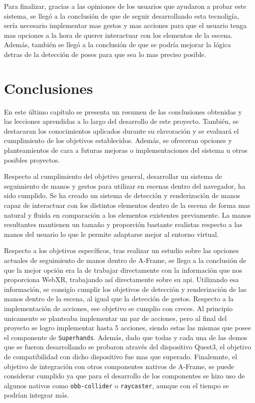 \documentclass[a4paper, 12pt]{book}
\begin{document}
Para finalizar, gracias a las opiniones de los usuarios que ayudaron a probar este sistema, se llegó a la conclusión de que de seguir desarrollando esta tecnoligía, sería necesario implementar mas gestos y mas acciones para que el usuario tenga mas opciones a la hora de querer interactuar con los elementos de la escena. Además, también se llegó a la conclusión de que se podría mejorar la lógica detras de la detección de poses para que sea lo mas preciso posible.


\cleardoublepage
\chapter{Conclusiones}
\label{chap:conclusiones}
En este último capítulo se presenta un resumen de las conclusiones obtenidas y las lecciones aprendidas a lo largo del desarrollo de este proyecto. También, se destacaran los conocimientos aplicados durante su elavoración y se evaluará el cumplimiento de los objetivos establecidos. Además, se ofreceran opciones y planteamientos de cara a futuras mejoras o implementaciones del sistema u otros posibles proyectos.

Respecto al cumplimiento del objetivo general, desarrollar un sistema de seguimiento de manos y gestos para utilizar en escenas dentro del navegador, ha sido cumplido. Se ha creado un sistema de detección y renderización de manos capaz de interactuar con los distintos elementos dentro de la escena de forma mas natural y fluida en comparación a los elementos existentes previamente. La manos resultantes mantienen un tamaño y proporción bastante realistas respecto a las manos del usuario lo que le permite adaptarse mejor al entorno virtual.

Respecto a los objetivos específicos, tras realizar un estudio sobre las opciones actuales de seguimiento de manos dentro de A-Frame, se llego a la conclusión de que la mejor opción era la de trabajar directamente con la información que nos proporciona WebXR, trabajando así directamente sobre su api. 
Utilizando esa información, se consigío cumplir los objetivos de detección y renderización de las manos dentro de la escena, al igual que la detección de gestos. 
Respecto a la implementación de acciones, ese objetivo se cumplio con creces. Al principio unicamente se planteaba implementar un par de acciones, pero al final del proyecto se logro implementar hasta 5 acciones, siendo estas las mismas que posee el componente de \texttt{Superhands}.
Además, dado que todas y cada una de las demos que se fueron desarrollando se probaron através del dispositivo Quest3, el objetivo de compatibilidad con dicho dispositivo fue mas que superado.
Finalemnte, el objetivo de integración con otros componentes nativos de A-Frame, se puede considerar cumplido ya que para el desarrollo de los componentes se hizo uso de algunos nativos como \texttt{obb-collider} o \texttt{raycaster}, aunque con el tiempo se podrían integrar más.
\end{document}
